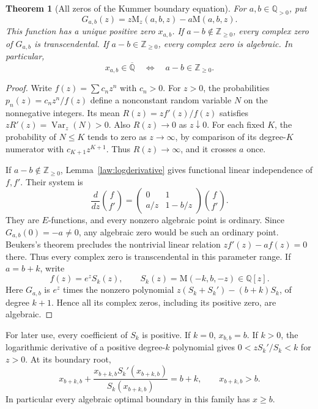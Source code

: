 \documentclass[11pt,a4paper]{article}
\newcommand{\Q}{\mathbb Q}
\newcommand{\Qbar}{\overline{\mathbb Q}}
\newcommand{\M}{\mathrm M}
\newtheorem{theorem}{Theorem}[section]
\theoremstyle{definition}
\theoremstyle{remark}
\numberwithin{equation}{section}
\begin{document}
\begin{theorem}[All zeros of the Kummer boundary equation]
\label{law:boundaryarith}\label{opt:general}
For $a,b\in\Q_{>0}$, put
\[
 G_{a,b}(z)=z\M_z(a,b,z)-a\M(a,b,z).
\]
This function has a unique positive zero $x_{a,b}$.
If $a-b\notin\mathbb Z_{\geq0}$, every complex zero of $G_{a,b}$ is
transcendental. If $a-b\in\mathbb Z_{\geq0}$, every complex zero is
algebraic. In particular,
\begin{equation}\label{law:boundaryclass}
 x_{a,b}\in\Qbar
 \quad\Longleftrightarrow\quad a-b\in\mathbb Z_{\geq0}.
\end{equation}
\end{theorem}
\begin{proof}
Write $f(z)=\sum c_nz^n$ with $c_n>0$. For $z>0$, the probabilities
$p_n(z)=c_nz^n/f(z)$ define a nonconstant random variable $N$ on the
nonnegative integers. Its mean $R(z)=zf'(z)/f(z)$ satisfies
$zR'(z)=\operatorname{Var}_z(N)>0$. Also $R(z)\to0$ as $z\downarrow0$.
For each fixed $K$, the probability of $N\leq K$ tends to zero as
$z\to\infty$, by comparison of its degree-$K$ numerator with
$c_{K+1}z^{K+1}$. Thus $R(z)\to\infty$, and it crosses $a$ once.

If $a-b\notin\mathbb Z_{\geq0}$, Lemma~\ref{law:logderivative} gives
functional linear independence of $f,f'$. Their system is
\[
 \frac d{dz}\binom f{f'}
 =\begin{pmatrix}0&1\\a/z&1-b/z\end{pmatrix}\binom f{f'}.
\]
They are $E$-functions, and every nonzero algebraic point is ordinary.
Since $G_{a,b}(0)=-a\ne0$, any algebraic zero would be such an ordinary
point. Beukers's theorem precludes the nontrivial linear relation
$zf'(z)-af(z)=0$ there. Thus every complex zero is transcendental in
this parameter range.
If $a=b+k$, write
\begin{equation}\label{law:Sk}
 f(z)=e^zS_k(z),\qquad S_k(z)=\M(-k,b,-z)\in\Q[z].
\end{equation}
Here $G_{a,b}$ is $e^z$ times the nonzero polynomial
$z(S_k+S_k')-(b+k)S_k$, of degree $k+1$. Hence all its complex zeros,
including its positive zero, are algebraic.
\end{proof}

For later use, every coefficient of $S_k$ is positive. If $k=0$,
$x_{b,b}=b$. If $k>0$, the logarithmic derivative of a positive
degree-$k$ polynomial gives $0<zS_k'/S_k<k$ for $z>0$.
At its boundary root,
\begin{equation}\label{law:boundarylower}
 x_{b+k,b}+\frac{x_{b+k,b}S_k'(x_{b+k,b})}{S_k(x_{b+k,b})}=b+k,
 \qquad x_{b+k,b}>b.
\end{equation}
In particular every algebraic optimal boundary in this family has
$x\geq b$.
\end{document}
